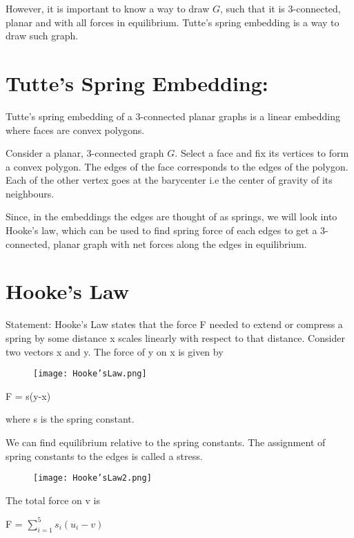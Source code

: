 \documentclass{article}
\begin{document}
     However, it is important to know a way to draw $G$, such that it is 3-connected, planar and with all forces in equilibrium. Tutte's spring embedding is a way to draw such graph.
     
    \section{Tutte's Spring Embedding:}
    Tutte's spring embedding of a 3-connected planar graphs is a linear embedding where faces are convex polygons.
    
    Consider a planar, 3-connected graph $G$. Select a face and fix its vertices to form a convex polygon. The edges of the face corresponds to the edges of the polygon. Each of the other vertex goes at the barycenter i.e the center of gravity of its neighbours. 
    
    Since, in the embeddings the edges are thought of as springs, we will look into Hooke's law, which can be used to find spring force of each edges to get a 3-connected, planar graph with net forces along the edges in equilibrium.
    
    
    \section{Hooke's Law}
    Statement: Hooke's Law states that the force F needed to extend or compress a spring by some distance x scales linearly with respect to that distance.
    Consider two vectors x and y.
    \newline The force of y on x is given by 
    \begin{figure}[h!]
            \centering
            \texttt{[image: Hooke'sLaw.png]}
    \end{figure}
    \newline F = s(y-x) 
    
    where s is the spring constant.
    
    We can find equilibrium relative to the spring constants. The assignment of spring constants to the edges is called a stress.
    
    \begin{figure}[h!]
            \centering
            \texttt{[image: Hooke'sLaw2.png]}
    \end{figure}
    \newline The total force on v is
    
    \newline F = $\sum_{i=1}^{5} s_i(u_i-v)$ 
    
\end{document}
